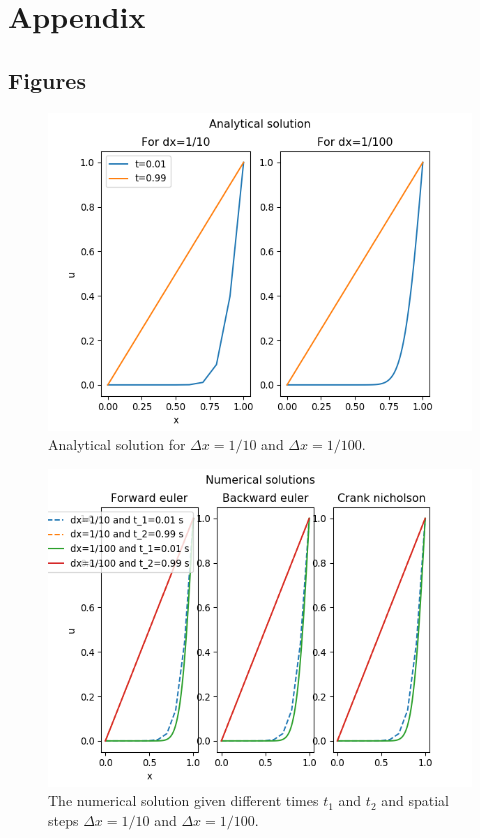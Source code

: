 \documentclass{article}
\begin{document}
\clearpage

\appendix %

\section{Appendix}

\subsection{Figures}

\begin{figure}[H]
	\centering
	\includegraphics[width=140mm]{b.png}
	\caption{Analytical solution for $\Delta x = 1/10$ and $\Delta x =1/100$.}
	\label{fig:b}
\end{figure}

\begin{figure}[H]
	\centering
	\includegraphics[width=140mm]{c.png}
	\caption{The numerical solution given different times $t_1$ and $t_2$ and spatial steps $\Delta x =1/10$ and $\Delta x = 1/100$.}
	\label{fig:c}
\end{figure}
\end{document}
